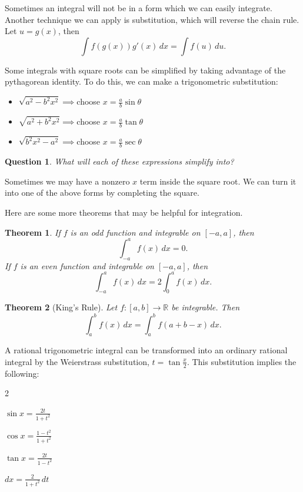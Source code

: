 \documentclass[11pt]{scrartcl}
\theoremstyle{plain}
\newtheorem{theorem}{Theorem}[section]
\newtheorem*{question}{Question}
\theoremstyle{definition}
\theoremstyle{remark}
\begin{document}
Sometimes an integral will not be in a form which we can easily integrate. Another technique we can apply is substitution, which will reverse the chain rule. Let $u=g(x)$, then
\[ \int f(g(x))g'(x) \, dx = \int f(u) \, du. \]

Some integrals with square roots can be simplified by taking advantage of the pythagorean identity. To do this, we can make a trigonometric substitution:

\begin{itemize}
    \item $\sqrt{ a^{2}-b^{2}x^{2} }\implies$choose $x=\frac{a}{b}\sin \theta$
    \item $\sqrt{ a^{2}+b^{2}x^{2} }\implies$choose $x=\frac{a}{b}\tan \theta$
    \item $\sqrt{ b^{2}x^{2}-a^{2} }\implies$choose $x=\frac{a}{b}\sec \theta$
\end{itemize}

\begin{question}
    What will each of these expressions simplify into?
\end{question}

Sometimes we may have a nonzero $x$ term inside the square root. We can turn it into one of the above forms by completing the square. \newpage

Here are some more theorems that may be helpful for integration.

\begin{theorem}
    If $f$ is an odd function and integrable on $[-a,a]$, then
    \[ \int_{-a}^{a} f(x) \, dx =0. \]
    If $f$ is an even function and integrable on $[-a,a]$, then
    \[ \int_{-a}^{a} f(x) \, dx =2\int_{0}^{a} f(x) \, dx . \]
\end{theorem}

\begin{theorem}[King's Rule]
    Let $f\colon[a,b]\to \mathbb{R}$ be integrable. Then
    \[ \int_{a}^{b} f(x) \, dx =\int_{a}^{b} f(a+b-x) \, dx . \]
\end{theorem}

A rational trigonometric integral can be transformed into an ordinary rational integral by the Weierstrass substitution, $t=\tan \frac{x}{2}$. This substitution implies the following:

\begin{itemize}
    \begin{multicols}{2}
        \item $\sin x=\frac{2t}{1+t^{2}}$
        \item $\cos x=\frac{{1-t^{2}}}{1+t^{2}}$
        \item $\tan x=\frac{2t}{1-t^{2}}$
        \item $dx=\frac{2}{1+t^{2}} \, dt$
    \end{multicols}
\end{itemize}
\end{document}

